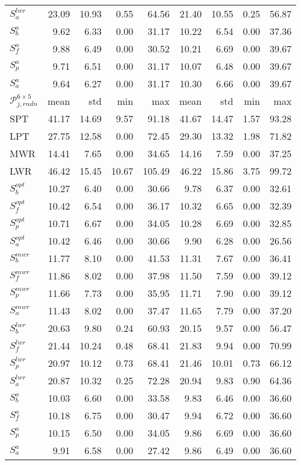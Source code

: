 {\begin{table}
{\begin{tabular}{|l|rrrr|rrrr|}
$S^{lwr}_a$ &23.09&10.93&0.55&64.56&21.40&10.55&0.25&56.87\\
$S^{a}_b$ &9.62&6.33&0.00&31.17&10.22&6.54&0.00&37.36\\
$S^{a}_f$ &9.88&6.49&0.00&30.52&10.21&6.69&0.00&39.67\\
$S^{a}_p$ &9.71&6.51&0.00&31.17&10.07&6.48&0.00&39.67\\
$S^{a}_a$ &9.64&6.27&0.00&31.17&10.30&6.66&0.00&39.67\\
\hline
$\mathcal{P}^{6\times5}_{j,rndn}$ & mean & std & min & max & mean & std & min & max \\
\hline
SPT &41.17&14.69&9.57&91.18&41.67&14.47&1.57&93.28\\
LPT &27.75&12.58&0.00&72.45&29.30&13.32&1.98&71.82\\
MWR &14.41&7.65&0.00&34.65&14.16&7.59&0.00&37.25\\
LWR &46.42&15.45&10.67&105.49&46.22&15.86&3.75&99.72\\
$S^{opt}_b$ &10.27&6.40&0.00&30.66&9.78&6.37&0.00&32.61\\
$S^{opt}_f$ &10.42&6.54&0.00&36.17&10.32&6.65&0.00&32.39\\
$S^{opt}_p$ &10.71&6.67&0.00&34.05&10.28&6.69&0.00&32.85\\
$S^{opt}_a$ &10.42&6.46&0.00&30.66&9.90&6.28&0.00&26.56\\
$S^{mwr}_b$ &11.77&8.10&0.00&41.53&11.31&7.67&0.00&36.41\\
$S^{mwr}_f$ &11.86&8.02&0.00&37.98&11.50&7.59&0.00&39.12\\
$S^{mwr}_p$ &11.66&7.73&0.00&35.95&11.71&7.90&0.00&39.12\\
$S^{mwr}_a$ &11.43&8.02&0.00&37.47&11.65&7.79&0.00&37.20\\
$S^{lwr}_b$ &20.63&9.80&0.24&60.93&20.15&9.57&0.00&56.47\\
$S^{lwr}_f$ &21.44&10.24&0.48&68.41&21.83&9.94&0.00&70.99\\
$S^{lwr}_p$ &20.97&10.12&0.73&68.41&21.46&10.01&0.73&66.12\\
$S^{lwr}_a$ &20.87&10.32&0.25&72.28&20.94&9.83&0.90&64.36\\
$S^{a}_b$ &10.03&6.60&0.00&33.58&9.83&6.46&0.00&36.60\\
$S^{a}_f$ &10.18&6.75&0.00&30.47&9.94&6.72&0.00&36.60\\
$S^{a}_p$ &10.15&6.50&0.00&34.05&9.86&6.69&0.00&36.60\\
$S^{a}_a$ &9.91&6.58&0.00&27.42&9.86&6.49&0.00&36.60\\ \hline 
\end{tabular}}
\end{table}
}
